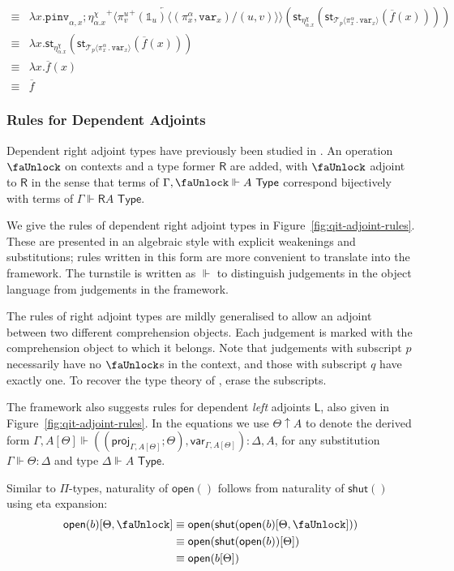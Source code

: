 \documentclass[10pt]{article}
\theoremstyle{definition}
\newcommand{\TYPE}{\,\,\mathsf{Type}}
\newcommand{\rewrite}[2]{\overleftarrow{#1}(#2)}
\newcommand\UI[2]{\ensuremath{\lambda #1.#2}}
\newcommand\StI[2]{\ensuremath{\mathsf{st}_{#1}(#2)}}
\newcommand\TrPlus[2]{\ensuremath{{#1}^+(#2)}}
\newcommand\ApEl[2]{\mathcal{T}_{#1}\langle#2\rangle}
\newcommand\bdot[0]{\mathbin{.}}
\newcommand\ap[2]{\ensuremath{#1 \langle #2 \rangle }}
\newcommand\ApPlus[2]{\ensuremath{{#1}^+ \langle #2 \rangle }}
\newcommand{\qyields}{\Vdash}
\newcommand{\upstairs}[1]{\overline{#1}}
\newcommand\proj[1]{\ensuremath{\mathsf{proj}_{#1}}}
\newcommand\qvar[1]{\ensuremath{\mathsf{var}_{#1}}}
\newcommand\One{\ensuremath{\mathds{1}}}
\newcommand\var[1]{\ensuremath{\mathtt{var}_{#1}}}
\newcommand\pinv[1]{\ensuremath{\mathtt{pinv}_{#1}}}
\newcommand{\lock}{\text{\faUnlock}}
\newcommand{\Rtype}[1]{\mathsf{R}{#1}}
\newcommand{\RI}[1]{\mathsf{shut}({#1})}
\newcommand{\RE}[1]{\mathsf{open}({#1})}
\newcommand{\Ltype}[1]{\mathsf{L}{#1}}
\begin{document}
\begin{enumerate}[style = multiline, labelwidth = 80pt]
\begin{align*}
\equiv{} &\UI{x}{\rewrite{\pinv{\alpha,x};\ApPlus{\eta^\chi_{\alpha.x}}{\ap{\TrPlus{\pi^u_v}{\One_u}}{(\pi^\alpha_x,\var{x})/(u,v)}}}{\StI{\eta^\chi_{\alpha.x}}{\StI{\ApEl{p}{\pi^\alpha_x \bdot \var{x}}}{\upstairs{f}(x)}}}} \\
\equiv{} &\UI{x}{\StI{\eta^\chi_{\alpha.x}}{\StI{\ApEl{p}{\pi^\alpha_x \bdot \var{x}}}{\upstairs{f}(x)}}} \\
\equiv{} &\UI{x}{\upstairs{f}(x)} \\
\equiv{} &\upstairs{f}
\end{align*}
\end{enumerate}

\subsubsection{Rules for Dependent Adjoints}

Dependent right adjoint types have previously been studied in . An operation $\lock$ on contexts and a type former $\Rtype{}$ are added, with $\lock$ adjoint to $\Rtype{}$ in the sense that terms of $\Gamma, \lock \qyields A \TYPE$ correspond bijectively with terms of $\Gamma \qyields \Rtype{A} \TYPE$.

We give the rules of dependent right adjoint types in Figure~\ref{fig:qit-adjoint-rules}. These are presented in an algebraic style with explicit weakenings and substitutions; rules written in this form are more convenient to translate into the framework. The turnstile is written as $\qyields$ to distinguish judgements in the object language from judgements in the framework.

The rules of right adjoint types are mildly generalised to allow an adjoint between two different comprehension objects. Each judgement is marked with the comprehension object to which it belongs. Note that judgements with subscript $p$ necessarily have no $\lock$s in the context, and those with subscript $q$ have exactly one. To recover the type theory of , erase the subscripts. 

The framework also suggests rules for dependent \emph{left} adjoints $\Ltype{}$, also given in Figure~\ref{fig:qit-adjoint-rules}. In the equations we use $\Theta \uparrow A$ to denote the derived form $\Gamma, A[\Theta] \qyields ((\proj{\Gamma, A[\Theta]}; \Theta) , \qvar{\Gamma, A[\Theta]}) : \Delta, A$, for any substitution $\Gamma \qyields \Theta : \Delta$ and type $\Delta \qyields A \TYPE$.

Similar to $\Pi$-types, naturality of $\RE{}$ follows from naturality of $\RI{}$ using eta expansion:
\begin{align*}
\RE{b}[\Theta, \lock] 
&\equiv \RE{\RI{\RE{b}[\Theta, \lock]}} \\
&\equiv \RE{\RI{\RE{b}}[\Theta]} \\
&\equiv \RE{b[\Theta]}
\end{align*}
\end{document}

